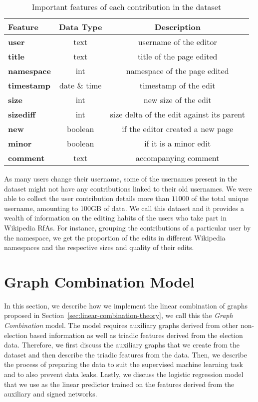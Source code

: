 \begin{table}[htp]
    \centering
    \caption{Important features of each contribution in the \usercontrib dataset}
    \label{tab:usercontrib-features}
    \begin{tabular}{lcc}
        \toprule
        Feature & Data Type & Description\\
        \midrule
        \textbf{user}&text& username of the editor\\
        \textbf{title}&text & title of the page edited\\
        \textbf{namespace}&int& namespace of the page edited\\
        \textbf{timestamp}&date \& time & timestamp of the edit\\
        \textbf{size}&int& new size of the edit \\
        \textbf{sizediff}& int & size delta of the edit against its parent\\
        \textbf{new}&boolean &if the editor created a new page \\
        \textbf{minor}&boolean& if it is a minor edit\\
        \textbf{comment}& text& accompanying comment\\
        \bottomrule
    \end{tabular}
\end{table}
As many users change their username, some of the usernames present in the \wikirfa dataset might not have any contributions linked to their old usernames.
We were able to collect the user contribution details more than $11000$ of the total unique username, amounting to 100GB of data.
We call this dataset \usercontrib and it provides a wealth of information on the editing habits of the users who take part in Wikipedia RfAs. 
For instance, grouping the contributions of a particular user by the namespace, we get the proportion of the edits in different Wikipedia namespaces and the respective sizes and quality of their edits.

\section{Graph Combination Model}
\label{sec:linear-combination-implementation}
In this section, we describe how we implement the linear combination of graphs proposed in Section~\ref{sec:linear-combination-theory}, we call this the \textit{Graph Combination} model.
The model requires auxiliary graphs derived from other non-election based information as well as triadic features derived from the election data.
Therefore, we first discuss the auxiliary graphs that we create from the \usercontrib dataset and then describe the triadic features from the \wikirfa data.
Then, we describe the process of preparing the data to suit the supervised machine learning task and to also prevent data leaks.
Lastly, we discuss the logistic regression model that we use as the linear predictor trained on the features derived from the auxiliary and signed networks.

